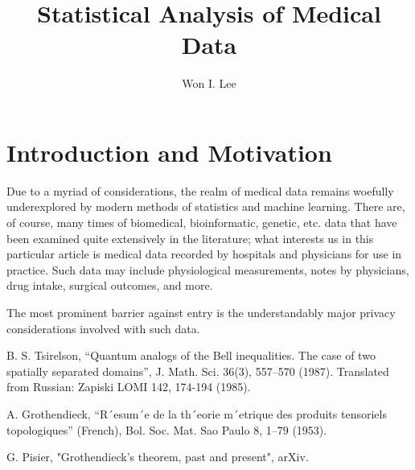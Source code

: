 \documentclass[psamsfonts]{amsart}
\title{Statistical Analysis of Medical Data}
\author{Won I. Lee}
\theoremstyle{definition}
\theoremstyle{remark}
\numberwithin{equation}{section}
\begin{document}
\maketitle
\section{Introduction and Motivation}

Due to a myriad of considerations, the realm of medical data remains woefully underexplored by modern methods of statistics and machine learning. There are, of course, many times of biomedical, bioinformatic, genetic, etc. data that have been examined quite extensively in the literature; what interests us in this particular article is medical data recorded by hospitals and physicians for use in practice. Such data may include physiological measurements, notes by physicians, drug intake, surgical outcomes, and more.

The most prominent barrier against entry is the understandably major privacy considerations involved with such data.

\begin{thebibliography}{9}

B. S. Tsirelson, “Quantum analogs of the Bell inequalities. The case of two spatially separated domains”,
J. Math. Sci. 36(3), 557–570 (1987). Translated from Russian: Zapiski LOMI 142, 174-194 (1985).

A. Grothendieck, “R´esum´e de la th´eorie m´etrique des produits tensoriels topologiques” (French), Bol. Soc.
Mat. Sao Paulo 8, 1–79 (1953).

G. Pisier, "Grothendieck's theorem, past and present", arXiv.

\end{thebibliography}
\end{document}
